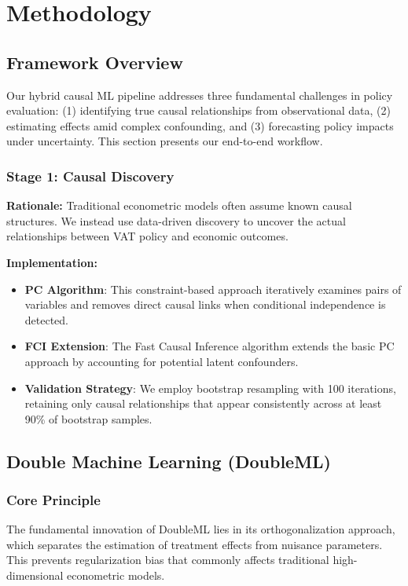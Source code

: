 \section{Methodology}\label{sec:methods}

\subsection{Framework Overview}\label{subsec:framework}

Our hybrid causal ML pipeline addresses three fundamental challenges in policy evaluation: (1) identifying true causal relationships from observational data, (2) estimating effects amid complex confounding, and (3) forecasting policy impacts under uncertainty. This section presents our end-to-end workflow.

\subsubsection{Stage 1: Causal Discovery}
\textbf{Rationale:} Traditional econometric models often assume known causal structures. We instead use data-driven discovery to uncover the actual relationships between VAT policy and economic outcomes.

\textbf{Implementation:}
\begin{itemize}
    \item \textbf{PC Algorithm}: This constraint-based approach iteratively examines pairs of variables and removes direct causal links when conditional independence is detected.
    \item \textbf{FCI Extension}: The Fast Causal Inference algorithm extends the basic PC approach by accounting for potential latent confounders.
    \item \textbf{Validation Strategy}: We employ bootstrap resampling with 100 iterations, retaining only causal relationships that appear consistently across at least 90\% of bootstrap samples.
\end{itemize}

\subsection{Double Machine Learning (DoubleML)}\label{subsec:doubleml}

\subsubsection{Core Principle}
The fundamental innovation of DoubleML lies in its orthogonalization approach, which separates the estimation of treatment effects from nuisance parameters. This prevents regularization bias that commonly affects traditional high-dimensional econometric models.

